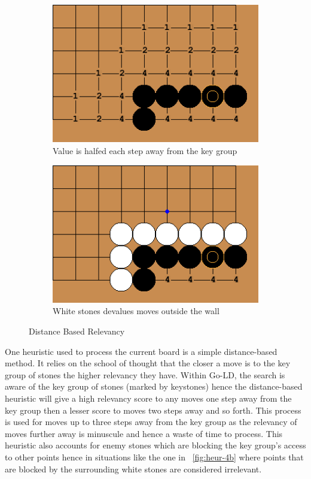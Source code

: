 \documentclass{l4proj}
\begin{document}
\begin{figure}[!ht]
\centering
\begin{subfigure}[b]{0.35\textwidth}
\centering
\includegraphics[width=\textwidth]{heur/4a.png}
\caption{Value is halfed each step away from the key group}
\label{fig:heur-4a}
\end{subfigure}
\begin{subfigure}[b]{0.35\textwidth}
\centering
\includegraphics[width=\textwidth]{heur/4b.png}
\caption{White stones devalues moves outside the wall}
\label{fig:heur-4b}
\end{subfigure}
\caption{Distance Based Relevancy}
\label{fig:heur-4}
\end{figure}

One heuristic used to process the current board is a simple distance-based method. It relies on the school of thought that the closer a move is to the key group of stones the higher relevancy they have. Within Go-LD, the search is aware of the key group of stones (marked by keystones) hence the distance-based heuristic will give a high relevancy score to any moves one step away from the key group then a lesser score to moves two steps away and so forth. This process is used for moves up to three steps away from the key group as the relevancy of moves further away is minuscule and hence a waste of time to process. This heuristic also accounts for enemy stones which are blocking the key group's access to other points hence in situations like the one in ~\autoref{fig:heur-4b} where points that are blocked by the surrounding white stones are considered irrelevant.
\end{document}
